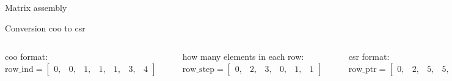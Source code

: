\documentclass[aspectratio=169,xcolor=dvipsnames]{beamer}
\begin{document}
\begin{frame}{Matrix assembly}

\end{frame}

\begin{frame}{Conversion coo to csr}
    \begin{columns}[c] %

coo format: \\
$\mathrm{row\_ind} = \begin{bmatrix}
		0, & 0, & 1, & 1, & 1, & 3, & 4 
		\end{bmatrix}$

\begin{center}
    \includegraphics[width=0.7\linewidth]{conversion1.png}
    \end{center}

how many elements in each row:
$\mathrm{row\_step} = \begin{bmatrix}
		0, & 2, & 3, & 0, & 1, & 1 
		\end{bmatrix}$

\begin{center}
    \includegraphics[width=0.7\linewidth]{conversion2.png}
    \end{center}

csr format: \\
$\mathrm{row\_ptr} = \begin{bmatrix}
		0, & 2, & 5, & 5, & 6, & 7 
		\end{bmatrix}$

        
        $ \left( \begin{array}{rrrrr} 
0 & 5.3 & 0 & 0 & 1.5\\ 
4.2 & 0& 3.1 & 0 & 2\\ 
0 & 0 & 0 & 0 & 0 \\
0 & 0 & 0 & 2.2 & 0 \\
1.9 & 0 & 0 & 0 & 0
\end{array} \right) $

    \end{columns}
\end{frame}
\end{document}

